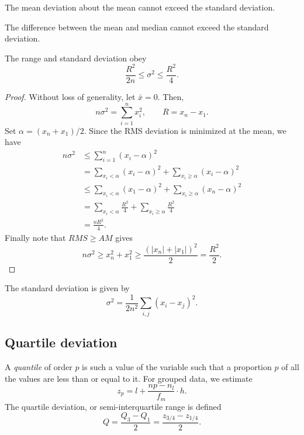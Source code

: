 \documentclass[11pt]{article}
\theoremstyle{definition}
\theoremstyle{remark}
\numberwithin{equation}{section}
\begin{document}
    \begin{theorem}
        The mean deviation about the mean cannot exceed the standard deviation.
    \end{theorem}
    \begin{theorem}
        The difference between the mean and median cannot exceed the standard
        deviation.
    \end{theorem}

    \begin{exercise}
        The range and standard deviation obey \[
            \frac{R^2}{2n} \leq \sigma^2 \leq \frac{R^2}{4}.
        \] 
    \end{exercise}
    \begin{proof}
        Without loss of generality, let $\bar{x} = 0$. Then, \[
            n\sigma^2 = \sum_{i = 1}^n x_i^2, \qquad R = x_n - x_1.
        \] Set $\alpha = (x_n + x_1) / 2$. Since the RMS deviation is minimized at
        the mean, we have \begin{align*}
            n\sigma^2 &\leq \sum_{i = 1}^n (x_i - \alpha)^2 \\
                &= \sum_{x_i < \alpha} (x_i - \alpha)^2 + \sum_{x_i \geq \alpha} (x_i
                - \alpha)^2 \\
                &\leq \sum_{x_i < \alpha} (x_1 - \alpha)^2 + \sum_{x_i \geq \alpha}
                (x_n - \alpha)^2 \\
                &= \sum_{x_i < \alpha} \frac{R^2}{4} + \sum_{x_i \geq \alpha}
                \frac{R^2}{4} \\
                &= \frac{nR^2}{4}.
        \end{align*}
        Finally note that $RMS \geq AM$ gives \[
            n\sigma^2 \geq x_n^2 + x_1^2 \geq \frac{(|x_n| + |x_1|)^2}{2} =
            \frac{R^2}{2}.
        \] 
    \end{proof}

    \begin{lemma}
        The standard deviation is given by \[
            \sigma^2 = \frac{1}{2n^2}\sum_{i, j} (x_i - x_j)^2.
        \] 
    \end{lemma}
    

    \subsection{Quartile deviation}
    
    A \emph{quantile} of order $p$ is such a value of the variable such that a
    proportion $p$ of all the values are less than or equal to it. For grouped data,
    we estimate \[
        z_p = l + \frac{np - n_l}{f_m}\cdot h.
    \] The quartile deviation, or semi-interquartile range is defined \[
        Q = \frac{Q_3 - Q_1}{2} = \frac{z_{3 / 4} - z_{1 / 4}}{2}.
    \] 
\end{document}

